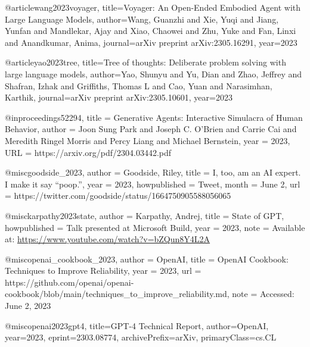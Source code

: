 @article{wang2023voyager,
  title={Voyager: An Open-Ended Embodied Agent with Large Language Models},
  author={Wang, Guanzhi and Xie, Yuqi and Jiang, Yunfan and Mandlekar, Ajay and Xiao, Chaowei and Zhu, Yuke and Fan, Linxi and Anandkumar, Anima},
  journal={arXiv preprint arXiv:2305.16291},
  year={2023}
}

@article{yao2023tree,
  title={Tree of thoughts: Deliberate problem solving with large language models},
  author={Yao, Shunyu and Yu, Dian and Zhao, Jeffrey and Shafran, Izhak and Griffiths, Thomas L and Cao, Yuan and Narasimhan, Karthik},
  journal={arXiv preprint arXiv:2305.10601},
  year={2023}
}

@inproceedings{52294,
title	= {Generative Agents: Interactive Simulacra of Human Behavior},
author	= {Joon Sung Park and Joseph C. O'Brien and Carrie Cai and Meredith Ringel Morris and Percy Liang and Michael Bernstein},
year	= {2023},
URL	= {https://arxiv.org/pdf/2304.03442.pdf}
}

@misc{goodside_2023,
  author = {Goodside, Riley},
  title = {I, too, am an AI expert. I make it say “poop.”},
  year = {2023},
  howpublished = {Tweet},
  month = {June 2},
  url = {https://twitter.com/goodside/status/1664750905588056065}
}

@misc{karpathy2023state,
  author = {Karpathy, Andrej},
  title = {State of GPT},
  howpublished = {Talk presented at Microsoft Build},
  year = {2023},
  note = {Available at: \url{https://www.youtube.com/watch?v=bZQun8Y4L2A}}
}

@misc{openai_cookbook_2023,
  author = {OpenAI},
  title = {OpenAI Cookbook: Techniques to Improve Reliability},
  year = {2023},
  url = {https://github.com/openai/openai-cookbook/blob/main/techniques_to_improve_reliability.md},
  note = {Accessed: June 2, 2023}
}

@misc{openai2023gpt4,
      title={GPT-4 Technical Report}, 
      author={OpenAI},
      year={2023},
      eprint={2303.08774},
      archivePrefix={arXiv},
      primaryClass={cs.CL}
}
